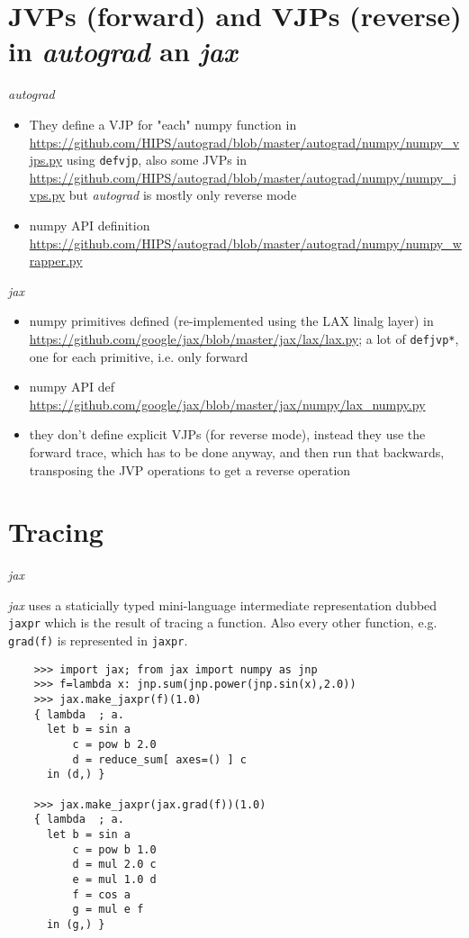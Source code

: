 \documentclass[paper=a4,11pt,headsepline]{scrartcl}
\begin{document}
\section{JVPs (forward) and VJPs (reverse) in \textsl{autograd} an \textsl{jax}}

\textsl{autograd}

\begin{itemize}
    \item They define a VJP for "each" numpy function in
        \url{https://github.com/HIPS/autograd/blob/master/autograd/numpy/numpy_vjps.py}
        using \texttt{defvjp}, also some JVPs in
        \url{https://github.com/HIPS/autograd/blob/master/autograd/numpy/numpy_jvps.py}
        but \textsl{autograd} is mostly only reverse mode
    \item numpy API definition
        \url{https://github.com/HIPS/autograd/blob/master/autograd/numpy/numpy_wrapper.py}
\end{itemize}

\textsl{jax}

\begin{itemize}
    \item numpy primitives defined (re-implemented using the LAX linalg layer) in
        \url{https://github.com/google/jax/blob/master/jax/lax/lax.py};
        a lot of \texttt{defjvp*}, one for each primitive, i.e. only forward
    \item numpy API def
        \url{https://github.com/google/jax/blob/master/jax/numpy/lax_numpy.py}
    \item they don't define explicit VJPs (for reverse mode), instead they use
        the forward trace, which has to be done anyway, and then run that
        backwards, transposing the JVP operations to get a reverse operation
\end{itemize}

\section{Tracing}

\textsl{jax}

\textsl{jax} uses a staticially typed mini-language intermediate representation
dubbed \texttt{jaxpr} which is the result of tracing a function. Also every
other function, e.g. \texttt{grad(f)} is represented in \texttt{jaxpr}.

\begin{verbatim}
    >>> import jax; from jax import numpy as jnp
    >>> f=lambda x: jnp.sum(jnp.power(jnp.sin(x),2.0))
    >>> jax.make_jaxpr(f)(1.0)
    { lambda  ; a.
      let b = sin a
          c = pow b 2.0
          d = reduce_sum[ axes=() ] c
      in (d,) }

    >>> jax.make_jaxpr(jax.grad(f))(1.0)
    { lambda  ; a.
      let b = sin a
          c = pow b 1.0
          d = mul 2.0 c
          e = mul 1.0 d
          f = cos a
          g = mul e f
      in (g,) }
\end{verbatim}
\end{document}
